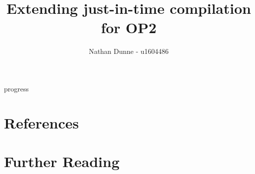 \documentclass[11pt]{article}
\title{Extending just-in-time compilation for OP2}
\author{Nathan Dunne - u1604486}
\begin{document}
\maketitle

\clearpage
\begin{btSect}{progress}
\section*{References}
\btPrintCited
\section*{Further Reading}
\btPrintNotCited
\end{btSect}
\end{document}
